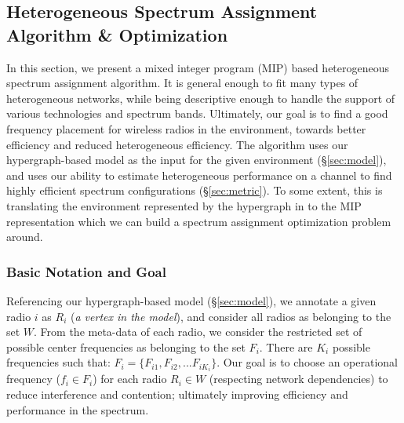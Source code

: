 
\subsection{Heterogeneous Spectrum Assignment \\Algorithm \& Optimization}



In this section, we present a mixed integer program (MIP) based heterogeneous spectrum assignment algorithm.  It is general enough to fit many types of heterogeneous networks, while being descriptive enough to handle the support of various technologies and spectrum bands.  Ultimately, our goal is to find a good frequency placement for wireless radios in the environment, towards better efficiency and reduced heterogeneous efficiency.  The algorithm uses our hypergraph-based model as the input for the given environment (\S\ref{sec:model}), and uses our ability to estimate heterogeneous performance on a channel to find highly efficient spectrum configurations (\S\ref{sec:metric}).   To some extent, this is translating the environment represented by the hypergraph in to the MIP representation which we can build a spectrum assignment optimization problem around.   


\smallskip

\subsubsection{Basic Notation and Goal}

Referencing our hypergraph-based model (\S\ref{sec:model}), we annotate a given radio $i$ as $R_i$ (\emph{a vertex in the model}), and consider all radios as belonging to the set $W$.   From the meta-data of each radio, we consider the restricted set of possible center frequencies as belonging to the set $F_i$.  There are $K_i$ possible frequencies such that:  $F_i = \{F_{i1}, F_{i2}, ... F_{iK_i}\}$.   Our goal is to choose an operational frequency ($f_{i} \in F_i$) for each radio $R_i \in W$ (respecting network dependencies) to reduce interference and contention; ultimately improving efficiency and performance in the spectrum.  

